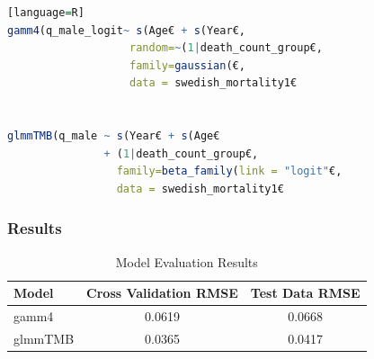 \documentclass[12pt, twoside,hidelinks]{article}
\theoremstyle{definition}
\numberwithin{equation}{section}
\begin{document}
\begin{lstlisting}[language=R][language=R]
gamm4(q_male_logit~ s(Age€ + s(Year€,
                   random=~(1|death_count_group€,
                   family=gaussian(€,
                   data = swedish_mortality1€ 


glmmTMB(q_male ~ s(Year€ + s(Age€
               + (1|death_count_group€,
                 family=beta_family(link = "logit"€, 
                 data = swedish_mortality1€
\end{lstlisting}

\subsubsection{Results}

\begin{table}[H]
\centering
\caption{Model Evaluation Results}
\label{table:model_evaluationmort}
\begin{tabular}{lcc}
\hline
\textbf{Model} & \textbf{Cross Validation RMSE} & \textbf{Test Data RMSE} \\
\hline
gamm4 & 0.0619  & 0.0668 \\
glmmTMB & 0.0365 & 0.0417 \\
\hline
\end{tabular}
\end{table}
\end{document}
